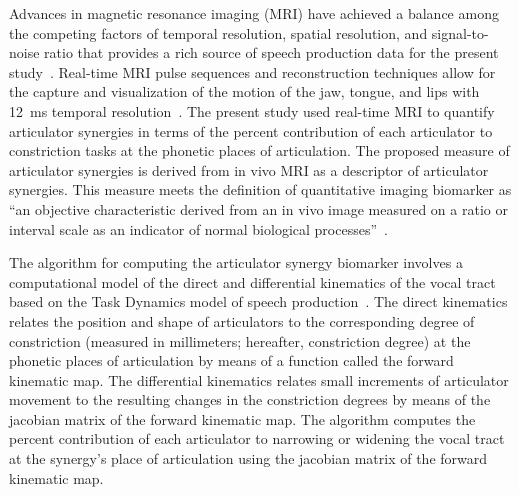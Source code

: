 \documentclass[preprint]{JASAnew}\usepackage[]{graphicx}\usepackage[]{color}
\begin{document}
Advances in magnetic resonance imaging (MRI) have achieved a balance among the competing factors of temporal resolution, spatial resolution, and signal-to-noise ratio that provides a rich source of speech production data for the present study~\citep{scott2014speech}. Real-time MRI pulse sequences and reconstruction techniques allow for the capture and visualization of the motion of the jaw, tongue, and lips with \SI{12}{\milli\second} temporal resolution~\citep{toutios2016advances,lingala2016state}. 
%
The present study used real-time MRI to quantify articulator synergies in terms of the percent contribution of each articulator to constriction tasks at the phonetic places of articulation.
%
The proposed measure of articulator synergies is derived from in vivo MRI as a descriptor of articulator synergies. This measure meets the definition of quantitative imaging biomarker as ``an objective characteristic derived from an in vivo image measured on a ratio or interval scale as an indicator of normal biological processes''~\citep{kessler2015emerging,sullivan2015metrology}. 





The algorithm for computing the articulator synergy biomarker involves a computational model of the direct and differential kinematics of the vocal tract~\citep{lammert2013statistical} based on the Task Dynamics model of speech production~\citep{saltzman1989dynamical}. 
%
The direct kinematics relates the position and shape of articulators to the corresponding degree of constriction (measured in millimeters; hereafter, constriction degree) at the phonetic places of articulation by means of a function called the forward kinematic map. 
%
The differential kinematics relates small increments of articulator movement to the resulting changes in the constriction degrees by means of the jacobian matrix of the forward kinematic map. 
%
The algorithm computes the percent contribution of each articulator to narrowing or widening the vocal tract at the synergy's place of articulation using the jacobian matrix of the forward kinematic map. 
\end{document}
